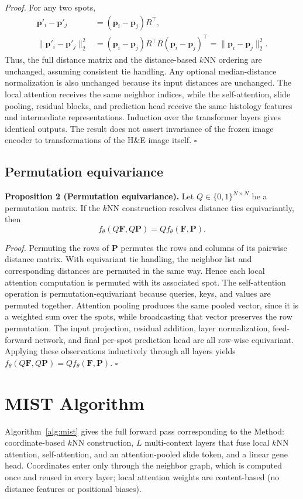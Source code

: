 \documentclass[11pt]{article}
\begin{document}
\textit{Proof.}
For any two spots,
\begin{align}
\mathbf{p}'_i-\mathbf{p}'_j
  &= (\mathbf{p}_i-\mathbf{p}_j)R^\top,\\
\|\mathbf{p}'_i-\mathbf{p}'_j\|_2^2
  &= (\mathbf{p}_i-\mathbf{p}_j)R^\top R(\mathbf{p}_i-\mathbf{p}_j)^\top
   = \|\mathbf{p}_i-\mathbf{p}_j\|_2^2.
\end{align}
Thus, the full distance matrix and the distance-based $k$NN ordering are unchanged, assuming
consistent tie handling. Any optional median-distance normalization is also unchanged because its
input distances are unchanged. The local attention receives the same neighbor indices, while the
self-attention, slide pooling, residual blocks, and prediction head receive the same histology
features and intermediate representations. Induction over the transformer layers gives identical
outputs. The result does not assert invariance of the frozen image encoder to transformations of the
H\&E image itself. $\square$

\subsection{Permutation equivariance}

\textbf{Proposition 2 (Permutation equivariance).}
Let $Q\in\{0,1\}^{N\times N}$ be a permutation matrix. If the $k$NN construction resolves distance
ties equivariantly, then
\begin{equation}
f_\theta(Q\mathbf{F},Q\mathbf{P})=Qf_\theta(\mathbf{F},\mathbf{P}).
\end{equation}

\textit{Proof.}
Permuting the rows of $\mathbf{P}$ permutes the rows and columns of its pairwise distance matrix.
With equivariant tie handling, the neighbor list and corresponding distances are permuted in the
same way. Hence each local attention computation is permuted with its associated spot. The
self-attention operation is permutation-equivariant because queries, keys, and values are permuted
together. Attention pooling produces the same pooled vector, since it is a weighted sum over the
spots, while broadcasting that vector preserves the row permutation. The input projection, residual
addition, layer normalization, feed-forward network, and final per-spot prediction head are all
row-wise equivariant. Applying these observations inductively through all layers yields
$f_\theta(Q\mathbf{F},Q\mathbf{P})=Qf_\theta(\mathbf{F},\mathbf{P})$. $\square$

\section{MIST Algorithm}
\label{app:algorithm}
Algorithm~\ref{alg:mist} gives the full forward pass corresponding to the Method:
coordinate-based $k$NN construction, $L$ multi-context layers that fuse local
$k$NN attention, self-attention, and an attention-pooled slide token, and a linear gene head.
Coordinates enter only through the neighbor graph, which is computed once and reused in every layer;
local attention weights are content-based (no distance features or positional biases).
\end{document}
